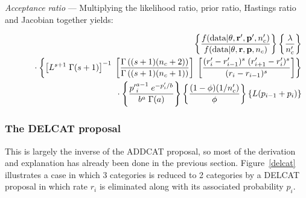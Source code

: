 \documentclass[12pt]{article}
\newcommand{\ncat}{n_c}
\begin{document}
{\em Acceptance ratio} --- Multiplying the likelihood ratio, prior ratio, Hastings ratio and Jacobian together yields:

\begin{eqnarray*}
& & \left\{ 
  \frac{f(\mbox{data} | {\bf \theta}, {\bf r}', {\bf p}', \ncat')}{f(\mbox{data} | {\bf \theta}, {\bf r}, {\bf p}, \ncat)} 
\right\}
\left\{ 
  \frac{\lambda}{\ncat'} 
\right\} \\
& & \rule{.2in}{.0in} \cdot 
\left\{ 
  \left[ L^{s+1} \; \Gamma(s+1)\right]^{-1} \; 
    \left[ \frac{\Gamma\left( (s+1) (\ncat + 2) \right)}{\Gamma\left( (s+1) (\ncat + 1) \right)} \right] \;
    \left[ \frac{(r'_i - r'_{i-1})^s \; (r'_{i+1} - r'_i)^s}{(r_i - r_{i-1})^s} \right]
\right\} \\
& & \rule{.2in}{.0in} \cdot 
\left\{ 
  \frac{ {p'}_i^{a-1} \; e^{-p'_i/b} }{ b^a \; \Gamma(a) } 
\right\} 
\left\{ 
  \frac{(1-\phi)(1/\ncat')}{\phi} 
\right\}
\left\{ 
  L(p_{i-1} + p_i) 
\right\}
\end{eqnarray*}


\subsubsection{The DELCAT proposal}

This is largely the inverse of the ADDCAT proposal, so most of the derivation and explanation has already been done in the previous section. Figure~\ref{delcat} illustrates a case in which 3 categories is reduced to 2 categories by a DELCAT proposal in which rate $r_i$ is eliminated along with its associated probability $p_i$.
\end{document}
